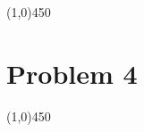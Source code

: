 \documentclass[12pt]{article}
\begin{document}
\begin{enumerate}
\begin{center}
\line(1,0){450}
\end{center}

\section{Problem 4}





\begin{center}
\line(1,0){450}
\end{center}



\end{enumerate}

















\end{document}
